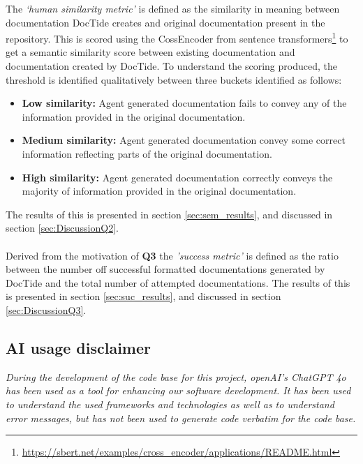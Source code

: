 The \textit{`human similarity metric'} is defined as the similarity in meaning between documentation DocTide creates and original documentation present in the repository. This is scored using the CossEncoder from sentence transformers\footnote{\url{https://sbert.net/examples/cross_encoder/applications/README.html}} to get a semantic similarity score between existing documentation and documentation created by DocTide. To understand the scoring produced, the threshold is identified qualitatively between three buckets identified as follows:
\begin{itemize}
    \item \textbf{Low similarity:} Agent generated documentation fails to convey any of the information provided in the original documentation.
    \item \textbf{Medium similarity:} Agent generated documentation convey some correct information reflecting parts of the original documentation.
    \item \textbf{High similarity:} Agent generated documentation correctly conveys the majority of information provided in the original documentation.
\end{itemize}
The results of this is presented in section \ref{sec:sem_results}, and discussed in section \ref{sec:DiscussionQ2}.
\\ \\
Derived from the motivation of \textbf{Q3} the \textit{'success metric'} is defined as the ratio between the number off successful formatted documentations generated by DocTide and the total number of attempted documentations. The results of this is presented in section \ref{sec:suc_results}, and discussed in section \ref{sec:DiscussionQ3}.

\subsection{AI usage disclaimer}
\textit{During the development of the code base for this project, openAI's ChatGPT 4o has been used as a tool for enhancing our software development. It has been used to understand the used frameworks and technologies as well as to understand error messages, but has not been used to generate code verbatim for the code base.
}